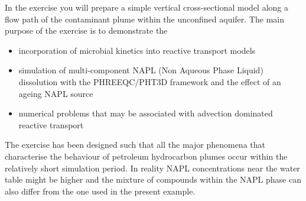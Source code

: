 In the exercise you will prepare a simple vertical cross-sectional model 
along a flow path of the contaminant plume within the unconfined aquifer. 
The main purpose of the exercise is to demonstrate the

\begin{itemize}

\item incorporation of microbial kinetics into reactive transport models

\item simulation of multi-component NAPL (Non Aqueous Phase Liquid) dissolution with the PHREEQC/PHT3D framework and the effect of an ageing NAPL source 

\item numerical problems that may be associated with advection dominated reactive transport

\end{itemize}

The exercise has been designed such that all the major phenomena that 
characterise the behaviour of petroleum hydrocarbon plumes occur within
the relatively short simulation period. In reality NAPL concentrations near the water table
might be higher and the mixture of compounds within the NAPL phase can 
also differ from the one used in the present example.

